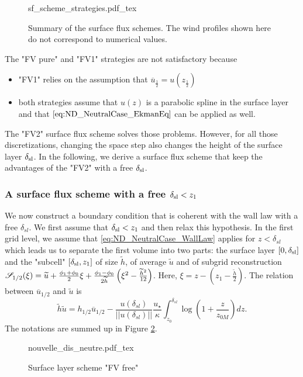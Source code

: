 \begin{figure}
	\centering
	{sf_scheme_strategies.pdf_tex}
	\caption{Summary of the surface flux schemes. The
	wind profiles shown here do not correspond to
	numerical values.}
	\label{fig:ND_NeutralCase_summary_sfscheme}
\end{figure}

The "FV pure" and "FV1" strategies are not satisfactory because
\begin{itemize}
	\item "FV1" relies on the assumption that $\overline{u}_{\frac{1}{2}} = u(z_{\frac{1}{2}})$
	\item both strategies assume that $u(z)$ is a parabolic spline in the surface layer and that $\eqref{eq:ND_NeutralCase_EkmanEq}$
		can be applied as well.
\end{itemize}
The "FV2" surface flux scheme solves those problems.
However, for all those discretizations, changing the space step
also changes the height of the surface layer $\delta_{\rm sl}$.
In the following, we derive a surface flux scheme that keep
the advantages of the "FV2" with a free $\delta_{\rm sl}$.

\subsubsection{A surface flux scheme with a free $\delta_{\rm sl}<z_1$}
We now construct a boundary condition that is coherent
with the wall law with a free $\delta_{sl}$. We first assume
that $\delta_{\rm sl} < z_1$ and then relax this hypothesis.
In the first grid level, we assume that
\eqref{eq:ND_NeutralCase_WallLaw} applies for $z<\delta_{sl}$
which leads us to separate the 
first volume into two parts: the surface layer $[0,\delta_{\rm sl}]$ and the "subcell" $[\delta_{\rm sl}, z_1]$ of size $\widetilde{h}$, of average $\widetilde{u}$
and of subgrid reconstruction
${\cal S}_{1/2}(\xi) = \widetilde{u} + \frac{\phi_{1} + \phi_{0}}{2} \xi
+ \frac{\phi_{1} - \phi_{0}}{2\widetilde{h}}\left(\xi^2 - \frac{\widetilde{h}^2}{12}\right)
$.
Here, $\xi = z - (z_1 - \frac{\widetilde{h}}{2})$.
The relation between $\overline{u}_{1/2}$ and $\widetilde{u}$ is 
\begin{equation}
\widetilde{h}\widetilde{u} = h_{1/2}\overline{u}_{1/2} - \frac{u(\delta_{sl})}{||u(\delta_{sl})||}\frac{{u_\star}}{\kappa}\int_{z_0}^{\delta_{sl}} \log(1+\frac{z}{z_{0M}}) dz.
\end{equation}
The notations are summed up in Figure
\ref{fig:ND_NeutralCase_nouvelle_dis_neutre}.
\begin{figure}
	{nouvelle_dis_neutre.pdf_tex}
	\caption{Surface layer scheme "FV free"}
	\label{fig:ND_NeutralCase_nouvelle_dis_neutre}
\end{figure}


